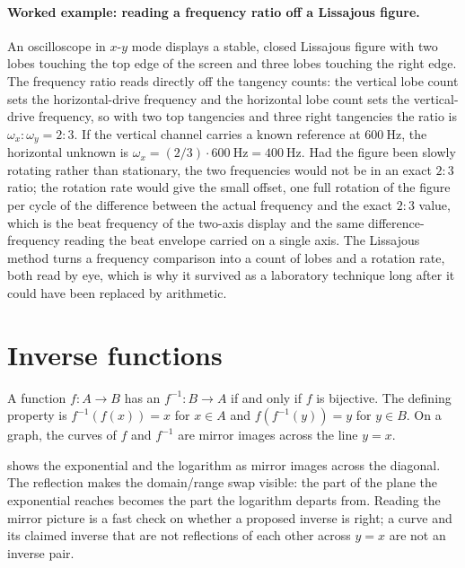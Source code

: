 \paragraph{Worked example: reading a frequency ratio off a Lissajous
figure.}
An oscilloscope in $x$-$y$ mode displays a stable, closed Lissajous
figure with two lobes touching the top edge of the screen and three
lobes touching the right edge. The frequency ratio reads directly off
the tangency counts: the vertical lobe count sets the horizontal-drive
frequency and the horizontal lobe count sets the vertical-drive
frequency, so with two top tangencies and three right tangencies the
ratio is $\omega_{x} : \omega_{y} = 2 : 3$. If the vertical channel
carries a known reference at $\SI{600}{\hertz}$, the horizontal
unknown is $\omega_{x} = (2/3) \cdot \SI{600}{\hertz} =
\SI{400}{\hertz}$. Had the figure been slowly rotating rather than
stationary, the two frequencies would not be in an exact $2 : 3$ ratio;
the rotation rate would give the small offset, one full rotation of the
figure per cycle of the difference between the actual frequency and the
exact $2 : 3$ value, which is the beat frequency of the two-axis display
and the same difference-frequency reading the beat envelope carried on a
single axis. The Lissajous method turns a frequency comparison into a
count of lobes and a rotation rate, both read by eye, which is why it
survived as a laboratory technique long after it could have been
replaced by arithmetic.



\section{Inverse functions}

A function $f: A \to B$ has an  $f^{-1}: B \to A$
if and only if $f$ is bijective. The defining property is
$f^{-1}(f(x)) = x$ for $x \in A$ and $f(f^{-1}(y)) = y$ for $y \in B$.
On a graph, the curves of $f$ and $f^{-1}$ are mirror images across
the line $y = x$.



 shows the exponential and the
logarithm as mirror images across the diagonal. The reflection makes
the domain/range swap visible: the part of the plane the exponential
reaches becomes the part the logarithm departs from. Reading the
mirror picture is a fast check on whether a proposed inverse is
right; a curve and its claimed inverse that are not reflections of
each other across $y = x$ are not an inverse pair.

